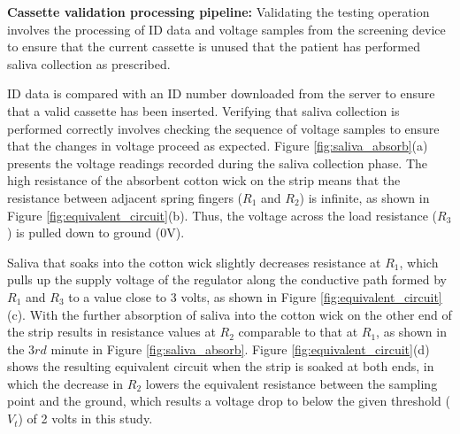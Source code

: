 \textbf{Cassette validation processing pipeline:}
\newline
Validating the testing operation involves the processing of ID data and voltage samples from the screening device to ensure that the current cassette is unused that the patient has performed saliva collection as prescribed.


ID data is compared with an ID number downloaded from the server to ensure that a valid cassette has been inserted. Verifying that saliva collection is performed correctly involves checking the sequence of voltage samples to ensure that the changes in voltage proceed as expected. Figure \ref{fig:saliva_absorb}(a) presents the voltage readings recorded during the saliva collection phase. The high resistance of the absorbent cotton wick on the strip means that the resistance between adjacent spring fingers ($R_1$ and $R_2$) is infinite, as shown in Figure \ref{fig:equivalent_circuit}(b). Thus, the voltage across the load resistance ($R_3$) is pulled down to ground (0V).


Saliva that soaks into the cotton wick slightly decreases resistance at $R_1$, which pulls up the supply voltage of the regulator along the conductive path formed by $R_1$ and $R_3$ to a value close to 3 volts, as shown in Figure \ref{fig:equivalent_circuit}(c). With the further absorption of saliva into the cotton wick on the other end of the strip results in resistance values at $R_2$ comparable to that at $R_1$, as shown in the 3$rd$ minute in Figure \ref{fig:saliva_absorb}. Figure \ref{fig:equivalent_circuit}(d) shows the resulting equivalent circuit when the strip is soaked at both ends, in which the decrease in $R_2$ lowers the equivalent resistance between the sampling point and the ground, which results a voltage drop to below the given threshold ($V_t$) of 2 volts in this study. 

